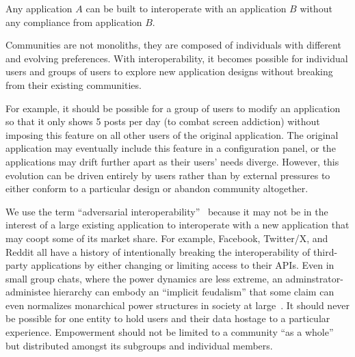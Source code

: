 

\begin{requirement}
\label{requirements:adversarial-interop}
Any application $A$ can be built to interoperate with an application $B$ without any compliance from application $B$.
\end{requirement}

Communities are not monoliths, they are composed of individuals
with different and evolving preferences.
With interoperability, it becomes possible for individual users and groups of users to explore new application designs
without breaking from their existing communities.

For example, it should be possible for a group of users to
modify an application so that it only shows 5 posts per day (to combat screen addiction)
without imposing this feature on all other users of the original application.
The original application may eventually include this feature in a configuration panel,
or the applications may drift further apart as their users' needs diverge. However, this
evolution can be driven entirely by users rather than by external pressures
to either conform to a particular design or abandon community altogether.


We use the term ``adversarial interoperability''~\cite{adversarialinterop} because it may not be in the
interest of a large existing application to interoperate with a new application that may coopt some of its market share.
For example, Facebook, Twitter/X, and Reddit all have a history of intentionally breaking
the interoperability of third-party applications by either changing or limiting access to their APIs.
Even in small group chats, where the power dynamics are less extreme,
an adminstrator-administee hierarchy
can embody an ``implicit feudalism'' that some claim can even
normalizes monarchical power structures in society at large~\cite{governablespaces}.
It should never be possible for one entity to hold users
and their data hostage to a particular experience.
Empowerment should not be limited to a community ``as a whole'' but
distributed amongst its subgroups and individual members.

